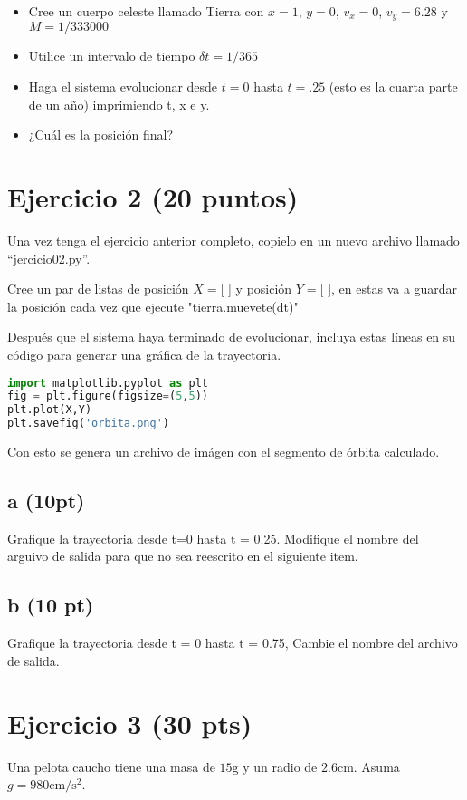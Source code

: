 \documentclass{article}
\begin{document}
\begin{itemize}
    \item Cree un cuerpo celeste llamado Tierra con $x=1$, $y=0$, $v_x=0$, $v_y=6.28$ y 
$M = 1 / 333000$
    \item Utilice un intervalo de tiempo $\delta t  = 1 / 365$
    \item Haga el sistema evolucionar desde $t=0$ hasta $t=.25$ (esto es la cuarta 
    parte de un año) imprimiendo t, x e y.
    \item ¿Cuál es la posición final?
\end{itemize}

\section*{Ejercicio 2 (20 puntos)}

Una vez tenga el ejercicio anterior completo, copielo en un nuevo archivo llamado
``jercicio02.py''. 

Cree un par de listas de posición $X=$[ ] y posición $Y=$[ ], en estas 
va a guardar la posición cada vez que ejecute "tierra.muevete(dt)"

Después que el sistema haya terminado de evolucionar, incluya estas líneas en su 
código para generar una gráfica de la trayectoria.

\begin{lstlisting}[language=Python, caption=Python example]
import matplotlib.pyplot as plt
fig = plt.figure(figsize=(5,5))
plt.plot(X,Y)
plt.savefig('orbita.png')
\end{lstlisting}

Con esto se genera un archivo de imágen con el segmento de órbita calculado.

\subsection*{a (10pt)}
Grafique la trayectoria desde t=0 hasta t = 0.25. Modifique el nombre del arguivo de salida para que no sea reescrito en el siguiente item.
\subsection*{b (10 pt)}
Grafique la trayectoria desde t = 0 hasta t = 0.75, Cambie el nombre del archivo de salida.

\section*{Ejercicio 3 (30 pts)}
Una pelota caucho tiene una masa de $15\mathrm{g}$ y
un radio de $2.6\mathrm{cm}$. Asuma $g = 980 \mathrm{cm/s^2}$.
\end{document}
